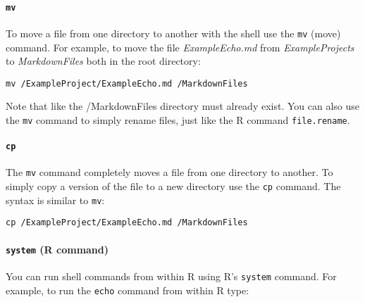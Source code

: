 \paragraph{{\tt{mv}}}

To move a file from one directory to another with the shell use the \texttt{mv} (move) command. For example, to move the file \emph{ExampleEcho.md} from \emph{ExampleProjects} to \emph{MarkdownFiles} both in the root directory:

\begin{knitrout}
\color{fgcolor}\begin{kframe}
\begin{verbatim}
mv /ExampleProject/ExampleEcho.md /MarkdownFiles
\end{verbatim}
\end{kframe}
\end{knitrout}


\noindent Note that like the /MarkdownFiles directory must already exist. You can also use the \texttt{mv} command to simply rename files, just like the R command \texttt{file.rename}.

\paragraph{{\tt{cp}}}

The \texttt{mv} command completely moves a file from one directory to another. To simply copy a version of the file to a new directory use the \texttt{cp} command. The syntax is similar to \texttt{mv}:

\begin{knitrout}
\color{fgcolor}\begin{kframe}
\begin{verbatim}
cp /ExampleProject/ExampleEcho.md /MarkdownFiles
\end{verbatim}
\end{kframe}
\end{knitrout}


\paragraph{{\tt{system}} (R command)}

You can run shell commands from within R using R's \texttt{system} command. For example, to run the \texttt{echo} command from within R type:

